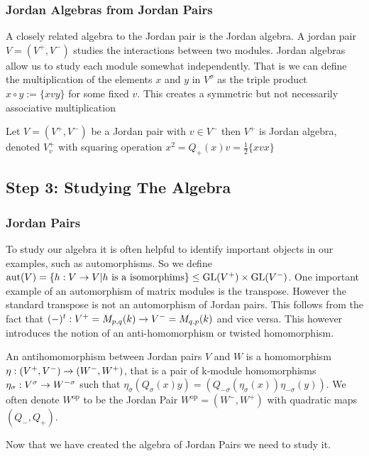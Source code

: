 \subsubsection*{Jordan Algebras from Jordan Pairs}
A closely related algebra to the Jordan pair is the Jordan algebra. A jordan pair $V=(V^+,V^-)$ 
studies the interactions between two modules. Jordan algebras allow us to study each module somewhat independently.
That is we can define the multiplication of the elements $x$ and $y$ in $V^\sigma$ as the triple 
product $x\circ y:=\{xvy\}$ for some fixed $v$. This creates a symmetric but not necessarily associative multiplication

\begin{definition}
    Let $V=(V^+,V^-)$ be a Jordan pair with $v\in V^-$ then $V^+$ is Jordan algebra, denoted $V^+_v$ with squaring operation 
    $x^2=Q_+(x)v=\frac{1}{2}\{xvx\}$  
\end{definition}


\subsection{Step 3: Studying The Algebra}
\subsubsection*{Jordan Pairs}
To study our algebra it is often helpful to identify important objects in our examples, such as automorphisms.
So we define 
$\text{aut}(V)=\{h:V\rightarrow V| h \text{ is a isomorphims}\}\leq \text{GL}(V^+)\times \text{GL}(V^-)$.  
One important example of an automorphism of matrix modules is the transpose. However the standard transpose is not an automorphism of Jordan pairs.
This follows from the fact that $(-)^t:V^+=M_{p,q}(k)\rightarrow V^-=M_{q,p}(k)$ and vice versa.
This however introduces the notion of an anti-homomorphism or twisted homomorphism.
\begin{definition}
    An antihomomorphism between Jordan pairs $V$ and $W$ is a homomorphism $\eta: (V^+,V^-)\rightarrow(W^-,W^+)$, that is a pair of k-module homomorphisms $\eta_\sigma:V^\sigma\rightarrow W^{-\sigma}$ such that
    $\eta_\sigma (Q_\sigma(x)y)=(Q_{-\sigma}(\eta_\sigma(x))\eta_{-\sigma} (y))$. We often denote $W^{\text{op}}$ to be the Jordan Pair $W^{\text{op}}=(W^-,W^+)$ with quadratic maps $(Q_-,Q_+)$.
\end{definition}
Now that we have created the algebra of Jordan Pairs we need to study it.